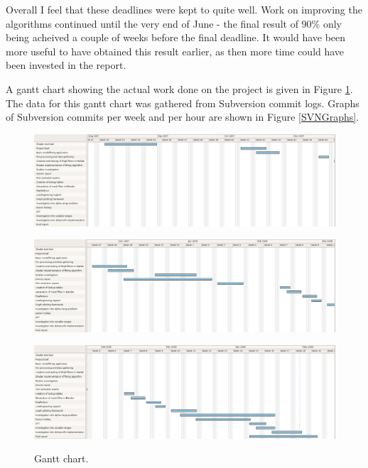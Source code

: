 Overall I feel that these deadlines were kept to quite well.
Work on improving the algorithms continued until the very end of June - the final result of 90\% only being acheived a couple of weeks before the final deadline.
It would have been more useful to have obtained this result earlier, as then more time could have been invested in the report.

A gantt chart showing the actual work done on the project is given in Figure \ref{GanttChart}.
The data for this gantt chart was gathered from Subversion commit logs.
Graphs of Subversion commits per week and per hour are shown in Figure \ref{SVNGraphs}.

\begin{landscape}
	\begin{figure}[p]
		\centering
		\includegraphics[width=21cm]{gantt.png}
	\end{figure}
	\begin{figure}[p]
		\centering
		\includegraphics[width=21cm]{gantt2.png}
	\end{figure}
	\begin{figure}[p]
		\centering
		\includegraphics[width=21cm]{gantt3.png}
		\label{GanttChart}
		\caption{Gantt chart.}
	\end{figure}
\end{landscape}



